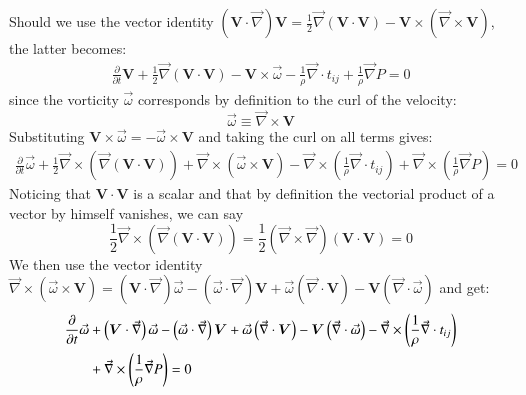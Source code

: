 \documentclass{warpdoc}
\newcommand{\alb}{\vspace{0.2cm}\\} %
\newcommand{\mfd}{\displaystyle}
\begin{document}
%
Should we use the vector identity
$\left( \bm{V} \cdot \vec{\nabla} \right) \bm{V}  = 
        \frac{1}{2} \vec{\nabla} \left( \bm{V} \cdot \bm{V} \right)
       -\bm{V} \times \left( \vec{\nabla} \times \bm{V} \right)$, the
latter becomes:
%
\begin{equation}
 \label{eqn:SDR:momentum6}
 \begin{array}{r}
  \mfd\frac{\partial}{\partial t} \bm{V}
      + \frac{1}{2} \vec{\nabla} \left( \bm{V} \cdot \bm{V} \right)
       -\bm{V} \times \vec{\omega}
      - \frac{1}{\rho} \vec{\nabla} \cdot t_{ij}
      +  \frac{1}{\rho} \vec{\nabla} P
      = 0
 \end{array}
\end{equation}
%
since the vorticity $\vec{\omega}$ corresponds by definition to the curl of the velocity:
%
\begin{equation}
  \vec{\omega} \equiv \vec{\nabla} \times \bm{V}
\end{equation}
%
Substituting $\bm{V} \times \vec{\omega} = - \vec{\omega} \times \bm{V}$
and taking the curl on all terms gives:
%
\begin{equation}
 \label{eqn:SDR:vorticity1}
 \begin{array}{r}
  \mfd\frac{\partial}{\partial t} \vec{\omega}
      + \frac{1}{2} \vec{\nabla} \times \left( \vec{\nabla} \left( \bm{V} \cdot \bm{V} \right)\right)
       +\vec{\nabla} \times \left(\vec{\omega} \times \bm{V}\right)
      - \vec{\nabla} \times \left( \frac{1}{\rho} \vec{\nabla} \cdot t_{ij} \right)
      + \vec{\nabla} \times \left( \frac{1}{\rho} \vec{\nabla} P \right)
      = 0
 \end{array}
\end{equation}
%
Noticing that $\bm{V}\cdot \bm{V}$ is a scalar and that by definition
the vectorial product of a vector by himself vanishes, we can say
%
\begin{displaymath}
\frac{1}{2} \vec{\nabla} \times \left( \vec{\nabla} \left( \bm{V} \cdot \bm{V} \right)\right)
 = \frac{1}{2} \left( \vec{\nabla} \times \vec{\nabla} \right) \left( \bm{V} \cdot \bm{V} \right)
 = 0
\end{displaymath}
%
We then use the vector identity
$\vec{\nabla} \times \left( \vec{\omega} \times \bm{V} \right) =
       \left( \bm{V} \cdot \vec{\nabla} \right) \vec{\omega}
      -\left( \vec{\omega} \cdot \vec{\nabla} \right) \bm{V}
      +\vec{\omega} \left( \vec{\nabla} \cdot \bm{V} \right)
      -\bm{V} \left( \vec{\nabla} \cdot \vec{\omega} \right)$ and get:
%
\begin{align}
  \mfd\frac{\partial}{\partial t} \vec{\omega}
      &+\left( \bm{V} \cdot \vec{\nabla} \right) \vec{\omega}
      -\left( \vec{\omega} \cdot \vec{\nabla} \right) \bm{V}
      +\vec{\omega} \left( \vec{\nabla} \cdot \bm{V} \right)
      -\bm{V} \left( \vec{\nabla} \cdot \vec{\omega} \right)
      -\vec{\nabla} \times \left( \frac{1}{\rho} \vec{\nabla} \cdot t_{ij} \right)\nonumber\alb
     &+\vec{\nabla} \times \left( \frac{1}{\rho} \vec{\nabla} P \right)
     =0
 \label{eqn:SDR:vorticity2}
\end{align}
\end{document}
